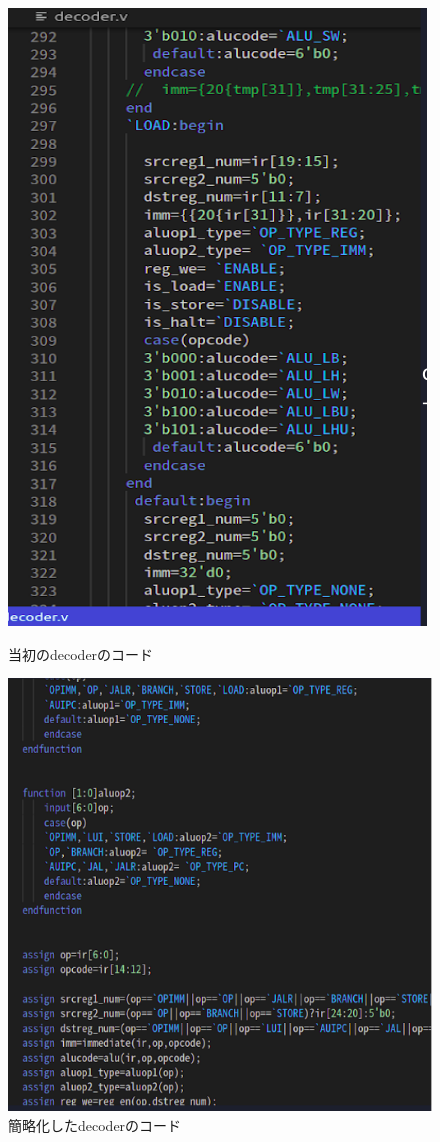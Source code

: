 \documentclass[12pt]{jreport}
\begin{document}
  \begin{figure}[H]
    \begin{minipage}[b]{0.45\linewidth}
      \centering
      \includegraphics[keepaspectratio, scale=0.5]{picture/deco.png}
      \caption{当初のdecoderのコード}
    \end{minipage}
    \begin{minipage}[b]{0.95\linewidth}
      \centering
      \includegraphics[keepaspectratio, scale=0.5]{picture/deco2.png}
      \caption{簡略化したdecoderのコード}
    \end{minipage}
  \end{figure}
  
\end{document}
